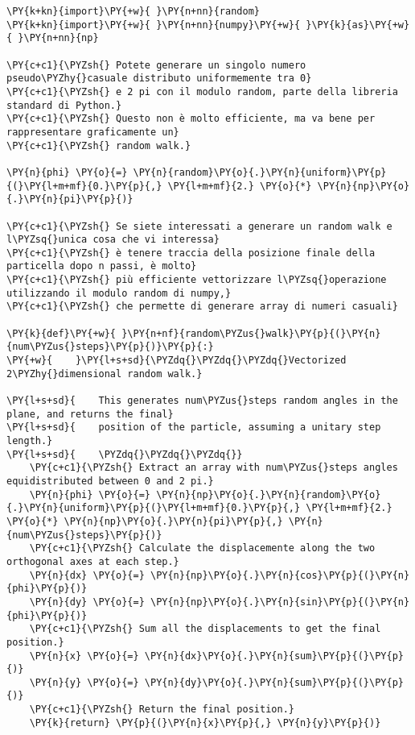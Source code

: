 \begin{Verbatim}[label=\makebox{\href{https://github.com/unipi-physics-labs/lab1-sheets/tree/main/snippy/random_walk_hints.py}{https://github.com/.../random\_walk\_hints.py}},commandchars=\\\{\}]
\PY{k+kn}{import}\PY{+w}{ }\PY{n+nn}{random}
\PY{k+kn}{import}\PY{+w}{ }\PY{n+nn}{numpy}\PY{+w}{ }\PY{k}{as}\PY{+w}{ }\PY{n+nn}{np}

\PY{c+c1}{\PYZsh{} Potete generare un singolo numero pseudo\PYZhy{}casuale distributo uniformemente tra 0}
\PY{c+c1}{\PYZsh{} e 2 pi con il modulo random, parte della libreria standard di Python.}
\PY{c+c1}{\PYZsh{} Questo non è molto efficiente, ma va bene per rappresentare graficamente un}
\PY{c+c1}{\PYZsh{} random walk.}

\PY{n}{phi} \PY{o}{=} \PY{n}{random}\PY{o}{.}\PY{n}{uniform}\PY{p}{(}\PY{l+m+mf}{0.}\PY{p}{,} \PY{l+m+mf}{2.} \PY{o}{*} \PY{n}{np}\PY{o}{.}\PY{n}{pi}\PY{p}{)}

\PY{c+c1}{\PYZsh{} Se siete interessati a generare un random walk e l\PYZsq{}unica cosa che vi interessa}
\PY{c+c1}{\PYZsh{} è tenere traccia della posizione finale della particella dopo n passi, è molto}
\PY{c+c1}{\PYZsh{} più efficiente vettorizzare l\PYZsq{}operazione utilizzando il modulo random di numpy,}
\PY{c+c1}{\PYZsh{} che permette di generare array di numeri casuali}

\PY{k}{def}\PY{+w}{ }\PY{n+nf}{random\PYZus{}walk}\PY{p}{(}\PY{n}{num\PYZus{}steps}\PY{p}{)}\PY{p}{:}
\PY{+w}{    }\PY{l+s+sd}{\PYZdq{}\PYZdq{}\PYZdq{}Vectorized 2\PYZhy{}dimensional random walk.}

\PY{l+s+sd}{    This generates num\PYZus{}steps random angles in the plane, and returns the final}
\PY{l+s+sd}{    position of the particle, assuming a unitary step length.}
\PY{l+s+sd}{    \PYZdq{}\PYZdq{}\PYZdq{}}
    \PY{c+c1}{\PYZsh{} Extract an array with num\PYZus{}steps angles equidistributed between 0 and 2 pi.}
    \PY{n}{phi} \PY{o}{=} \PY{n}{np}\PY{o}{.}\PY{n}{random}\PY{o}{.}\PY{n}{uniform}\PY{p}{(}\PY{l+m+mf}{0.}\PY{p}{,} \PY{l+m+mf}{2.} \PY{o}{*} \PY{n}{np}\PY{o}{.}\PY{n}{pi}\PY{p}{,} \PY{n}{num\PYZus{}steps}\PY{p}{)}
    \PY{c+c1}{\PYZsh{} Calculate the displacemente along the two orthogonal axes at each step.}
    \PY{n}{dx} \PY{o}{=} \PY{n}{np}\PY{o}{.}\PY{n}{cos}\PY{p}{(}\PY{n}{phi}\PY{p}{)}
    \PY{n}{dy} \PY{o}{=} \PY{n}{np}\PY{o}{.}\PY{n}{sin}\PY{p}{(}\PY{n}{phi}\PY{p}{)}
    \PY{c+c1}{\PYZsh{} Sum all the displacements to get the final position.}
    \PY{n}{x} \PY{o}{=} \PY{n}{dx}\PY{o}{.}\PY{n}{sum}\PY{p}{(}\PY{p}{)}
    \PY{n}{y} \PY{o}{=} \PY{n}{dy}\PY{o}{.}\PY{n}{sum}\PY{p}{(}\PY{p}{)}
    \PY{c+c1}{\PYZsh{} Return the final position.}
    \PY{k}{return} \PY{p}{(}\PY{n}{x}\PY{p}{,} \PY{n}{y}\PY{p}{)}
\end{Verbatim}

